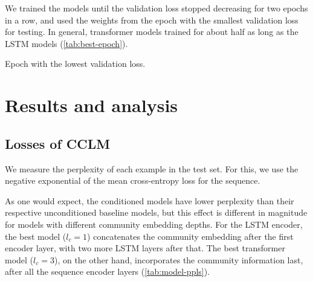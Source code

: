 \documentclass[11pt,a4paper]{article}
\begin{document}
We trained the models until the validation loss stopped decreasing 
for two epochs in a row,
and used the weights from the epoch with the smallest validation loss for testing.
In general, transformer models trained for about half as long as the LSTM models (\cref{tab:best-epoch}).

\begin{table}
  \centering
  
  \caption{Epoch with the lowest validation loss.}
  \label{tab:best-epoch}
\end{table}



\section{Results and analysis}

\subsection{Losses of CCLM}

We measure the perplexity of each example in the test set. 
For this, we use the negative exponential of the mean cross-entropy loss 
for the sequence.

As one would expect, 
the conditioned models have lower perplexity
than their respective unconditioned baseline models,
but this effect is different in magnitude
for models with different community embedding depths.
For the LSTM encoder, 
the best model ($l_c=1$) concatenates the community embedding after the first encoder layer,
with two more LSTM layers after that.
The best transformer model ($l_c=3$), on the other hand,
incorporates the community information last,
after all the sequence encoder layers
(\cref{tab:model-ppls}).

\end{document}
